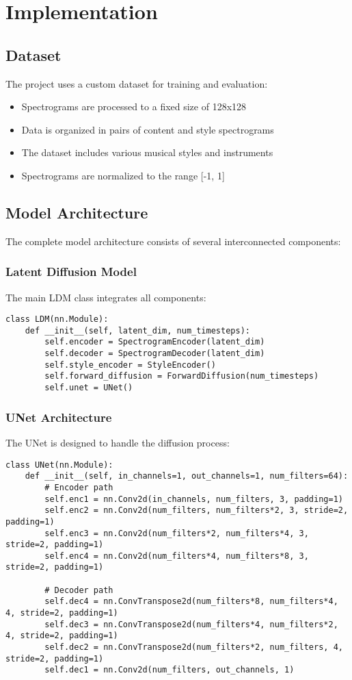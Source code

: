 \section{Implementation}

\subsection{Dataset}
The project uses a custom dataset for training and evaluation:
\begin{itemize}
    \item Spectrograms are processed to a fixed size of 128x128
    \item Data is organized in pairs of content and style spectrograms
    \item The dataset includes various musical styles and instruments
    \item Spectrograms are normalized to the range [-1, 1]
\end{itemize}

\subsection{Model Architecture}
The complete model architecture consists of several interconnected components:

\subsubsection{Latent Diffusion Model}
The main LDM class integrates all components:
\begin{lstlisting}
class LDM(nn.Module):
    def __init__(self, latent_dim, num_timesteps):
        self.encoder = SpectrogramEncoder(latent_dim)
        self.decoder = SpectrogramDecoder(latent_dim)
        self.style_encoder = StyleEncoder()
        self.forward_diffusion = ForwardDiffusion(num_timesteps)
        self.unet = UNet()
\end{lstlisting}

\subsubsection{UNet Architecture}
The UNet is designed to handle the diffusion process:
\begin{lstlisting}
class UNet(nn.Module):
    def __init__(self, in_channels=1, out_channels=1, num_filters=64):
        # Encoder path
        self.enc1 = nn.Conv2d(in_channels, num_filters, 3, padding=1)
        self.enc2 = nn.Conv2d(num_filters, num_filters*2, 3, stride=2, padding=1)
        self.enc3 = nn.Conv2d(num_filters*2, num_filters*4, 3, stride=2, padding=1)
        self.enc4 = nn.Conv2d(num_filters*4, num_filters*8, 3, stride=2, padding=1)
        
        # Decoder path
        self.dec4 = nn.ConvTranspose2d(num_filters*8, num_filters*4, 4, stride=2, padding=1)
        self.dec3 = nn.ConvTranspose2d(num_filters*4, num_filters*2, 4, stride=2, padding=1)
        self.dec2 = nn.ConvTranspose2d(num_filters*2, num_filters, 4, stride=2, padding=1)
        self.dec1 = nn.Conv2d(num_filters, out_channels, 1)
\end{lstlisting}

